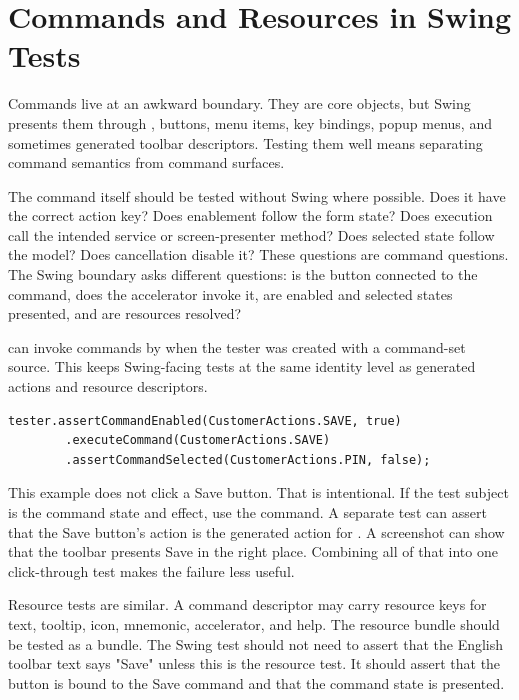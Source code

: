 \section{Commands and Resources in Swing Tests}

Commands live at an awkward boundary. They are core objects, but Swing presents them through , buttons, menu items, key bindings, popup menus, and sometimes generated toolbar descriptors. Testing them well means separating command semantics from command surfaces.

The command itself should be tested without Swing where possible. Does it have the correct action key? Does enablement follow the form state? Does execution call the intended service or screen-presenter method? Does selected state follow the model? Does cancellation disable it? These questions are command questions. The Swing boundary asks different questions: is the button connected to the command, does the accelerator invoke it, are enabled and selected states presented, and are resources resolved?

 can invoke commands by  when the tester was created with a command-set source. This keeps Swing-facing tests at the same identity level as generated actions and resource descriptors.

\begin{lstlisting}[caption={Asserting and invoking presenter commands by action key.}]
tester.assertCommandEnabled(CustomerActions.SAVE, true)
        .executeCommand(CustomerActions.SAVE)
        .assertCommandSelected(CustomerActions.PIN, false);
\end{lstlisting}

This example does not click a Save button. That is intentional. If the test subject is the command state and effect, use the command. A separate test can assert that the Save button's action is the generated action for . A screenshot can show that the toolbar presents Save in the right place. Combining all of that into one click-through test makes the failure less useful.

Resource tests are similar. A command descriptor may carry resource keys for text, tooltip, icon, mnemonic, accelerator, and help. The resource bundle should be tested as a bundle. The Swing test should not need to assert that the English toolbar text says "Save" unless this is the resource test. It should assert that the button is bound to the Save command and that the command state is presented.

